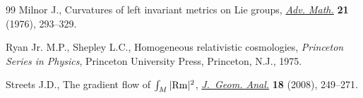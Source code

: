 \documentclass[pdftex]{sigma}
\numberwithin{equation}{section}
\begin{document}
\begin{thebibliography}{99}
Milnor J., Curvatures of left invariant metrics on {L}ie groups, \href{https://doi.org/10.1016/S0001-8708(76)80002-3}{\textit{Adv.
 Math.}} \textbf{21} (1976), 293--329.

Ryan Jr. M.P., Shepley L.C., Homogeneous relativistic cosmologies, \textit{Princeton
 Series in Physics}, Princeton University Press, Princeton, N.J., 1975.

Streets J.D., The gradient flow of {$\int_M|{\rm Rm}|^2$}, \href{https://doi.org/10.1007/s12220-007-9000-0}{\textit{J.~Geom.
 Anal.}} \textbf{18} (2008), 249--271.

\end{thebibliography}\LastPageEnding
\end{document}
